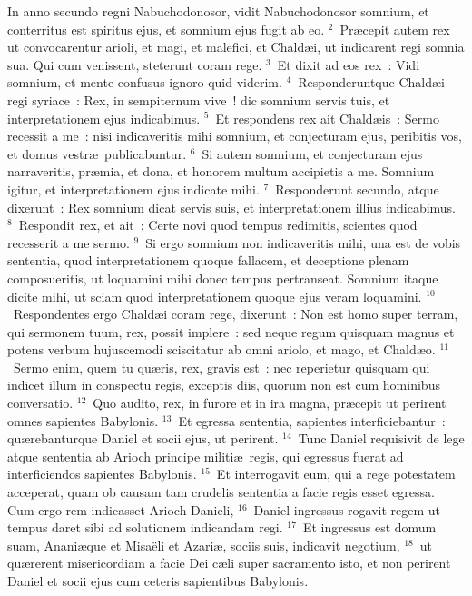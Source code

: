 \lettrine[lines=10,image=true,loversize=0.05,lraise=-0.03]{I}{}n anno secundo regni Nabuchodonosor, vidit Nabuchodonosor somnium, et conterritus est spiritus ejus, et somnium ejus fugit ab eo.
${}^{2}$~Pr\ae cepit autem rex ut convocarentur arioli, et magi, et malefici, et Chald\ae i, ut indicarent regi somnia sua. Qui cum venissent, steterunt coram rege.
${}^{3}$~Et dixit ad eos rex~: Vidi somnium, et mente confusus ignoro quid viderim.
${}^{4}$~Responderuntque Chald\ae i regi syriace~: Rex, in sempiternum vive~! dic somnium servis tuis, et interpretationem ejus indicabimus.
${}^{5}$~Et respondens rex ait Chald\ae is~: Sermo recessit a me~: nisi indicaveritis mihi somnium, et conjecturam ejus, peribitis vos, et domus vestr\ae\ publicabuntur.
${}^{6}$~Si autem somnium, et conjecturam ejus narraveritis, pr\ae mia, et dona, et honorem multum accipietis a me. Somnium igitur, et interpretationem ejus indicate mihi.
${}^{7}$~Responderunt secundo, atque dixerunt~: Rex somnium dicat servis suis, et interpretationem illius indicabimus.
${}^{8}$~Respondit rex, et ait~: Certe novi quod tempus redimitis, scientes quod recesserit a me sermo.
${}^{9}$~Si ergo somnium non indicaveritis mihi, una est de vobis sententia, quod interpretationem quoque fallacem, et deceptione plenam composueritis, ut loquamini mihi donec tempus pertranseat. Somnium itaque dicite mihi, ut sciam quod interpretationem quoque ejus veram loquamini.
${}^{10}$~Respondentes ergo Chald\ae i coram rege, dixerunt~: Non est homo super terram, qui sermonem tuum, rex, possit implere~: sed neque regum quisquam magnus et potens verbum hujuscemodi sciscitatur ab omni ariolo, et mago, et Chald\ae o.
${}^{11}$~Sermo enim, quem tu qu\ae ris, rex, gravis est~: nec reperietur quisquam qui indicet illum in conspectu regis, exceptis diis, quorum non est cum hominibus conversatio.
${}^{12}$~Quo audito, rex, in furore et in ira magna, pr\ae cepit ut perirent omnes sapientes Babylonis.
${}^{13}$~Et egressa sententia, sapientes interficiebantur~: qu\ae rebanturque Daniel et socii ejus, ut perirent.
${}^{14}$~Tunc Daniel requisivit de lege atque sententia ab Arioch principe militi\ae\ regis, qui egressus fuerat ad interficiendos sapientes Babylonis.
${}^{15}$~Et interrogavit eum, qui a rege potestatem acceperat, quam ob causam tam crudelis sententia a facie regis esset egressa. Cum ergo rem indicasset Arioch Danieli,
${}^{16}$~Daniel ingressus rogavit regem ut tempus daret sibi ad solutionem indicandam regi.
${}^{17}$~Et ingressus est domum suam, Anani\ae que et Misa\"eli et Azari\ae , sociis suis, indicavit negotium,
${}^{18}$~ut qu\ae rerent misericordiam a facie Dei c\ae li super sacramento isto, et non perirent Daniel et socii ejus cum ceteris sapientibus Babylonis.



